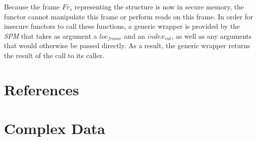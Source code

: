 \documentclass[10pt,a4paper,master=cws, masteroption=ai,english,inputenc=utf8]{kulemt}
\begin{document}
\begin{description}
Because the frame $Fr_{s}$ representing the structure is now in secure memory, the functor cannot manipulate this frame or perform reads on this frame.
In order for insecure functors to call these functions, a generic wrapper is provided by the \emph{SPM} that takes as argument a $loc_{frame}$ and an $index_{val}$, as well as any arguments that would otherwise be passed directly.
As a result, the generic wrapper returns the result of the call to its caller.
\end{description}


\chapter{References\label{chap:References}\label{test}}
\chapter{Complex Data\label{chap:ComplexData}}



\end{document}
